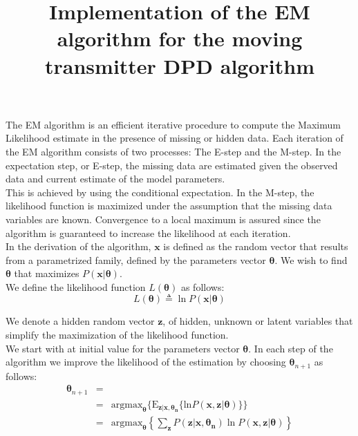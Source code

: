 \documentclass[10pt,a4paper]{report}
\begin{document}
\title{Implementation of the EM algorithm for the moving transmitter DPD algorithm}
\maketitle
The EM algorithm is an efficient iterative procedure to compute the Maximum Likelihood estimate in the presence of missing or hidden data.
Each iteration of the EM algorithm consists of two processes: The E-step and the M-step. In the expectation step, or E-step, the missing data are estimated given the observed data and current estimate of the model parameters.\\


This is achieved by using the conditional expectation. In the M-step, the likelihood function is maximized under the assumption that the missing data variables are known.
Convergence to a local maximum is assured since the algorithm is guaranteed to increase the likelihood at each iteration.\\



In the derivation of the algorithm, $\mathbf{x}$ is defined as the random vector that results from a parametrized family, defined by the parameters vector $\mathbf{\theta}$.
We wish to find $\mathbf{\theta}$ that maximizes $P(\mathbf{x}|\mathbf{\theta})$.\\

We define the likelihood function $L(\mathbf{\theta})$ as follows:
\begin{equation}
L(\mathbf{\theta}) \triangleq \ln P(\mathbf{x}|\mathbf{\theta})
\end{equation}


We denote a hidden random vector $\mathbf{z}$, of hidden, unknown or latent variables that simplify the maximization of the likelihood function.\\

We start with at initial value for the parameters vector $\mathbf{\theta}$. In each step of the algorithm we improve the likelihood of the estimation by choosing $\mathbf{\theta}_{n+1}$ as follows:
\begin{eqnarray}
\mathbf{\theta}_{n+1} &=& \\
&=& \text{argmax}_{\mathbf{\theta}}\{\text{E}_{\mathbf{z}|\mathbf{x,\theta_n}}\{\text{ln}P(\mathbf{x,z|\theta}) \}\} \nonumber \\
&=& \text{argmax}_{\mathbf{\theta}}\left\{\sum_{\mathbf{z}}P(\mathbf{z|x,\theta_n}) \ln P(\mathbf{x,z|\theta})\right\} \nonumber
\end{eqnarray}
\end{document}
